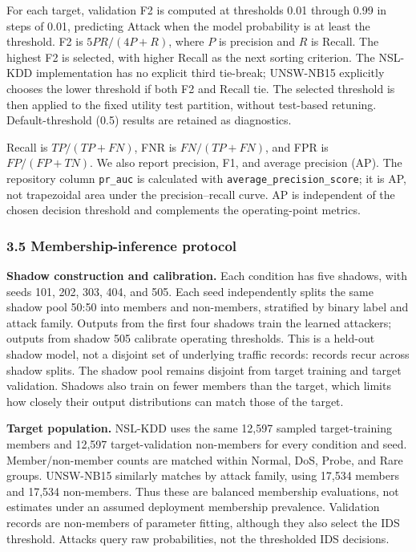\documentclass[11pt,a4paper]{article}
\begin{document}
For each target, validation F2 is computed at thresholds 0.01 through
0.99 in steps of 0.01, predicting Attack when the model probability is
at least the threshold. F2 is \(5PR/(4P+R)\), where \(P\) is precision
and \(R\) is Recall. The highest F2 is selected, with higher Recall as
the next sorting criterion. The NSL-KDD implementation has no explicit
third tie-break; UNSW-NB15 explicitly chooses the lower threshold if
both F2 and Recall tie. The selected threshold is then applied to the
fixed utility test partition, without test-based retuning.
Default-threshold (0.5) results are retained as diagnostics.

Recall is \(TP/(TP+FN)\), FNR is \(FN/(TP+FN)\), and FPR is
\(FP/(FP+TN)\). We also report precision, F1, and average precision
(AP). The repository column \texttt{pr\_auc} is calculated with
\texttt{average\_precision\_score}; it is AP, not trapezoidal area under
the precision--recall curve. AP is independent of the chosen decision
threshold and complements the operating-point metrics.

\hypertarget{membership-inference-protocol}{%
\subsubsection{3.5 Membership-inference
protocol}\label{membership-inference-protocol}}

\textbf{Shadow construction and calibration.} Each condition has five
shadows, with seeds 101, 202, 303, 404, and 505. Each seed independently
splits the same shadow pool 50:50 into members and non-members,
stratified by binary label and attack family. Outputs from the first
four shadows train the learned attackers; outputs from shadow 505
calibrate operating thresholds. This is a held-out shadow model, not a
disjoint set of underlying traffic records: records recur across shadow
splits. The shadow pool remains disjoint from target training and target
validation. Shadows also train on fewer members than the target, which
limits how closely their output distributions can match those of the
target.

\textbf{Target population.} NSL-KDD uses the same 12,597 sampled
target-training members and 12,597 target-validation non-members for
every condition and seed. Member/non-member counts are matched within
Normal, DoS, Probe, and Rare groups. UNSW-NB15 similarly matches by
attack family, using 17,534 members and 17,534 non-members. Thus these
are balanced membership evaluations, not estimates under an assumed
deployment membership prevalence. Validation records are non-members of
parameter fitting, although they also select the IDS threshold. Attacks
query raw probabilities, not the thresholded IDS decisions.
\end{document}
